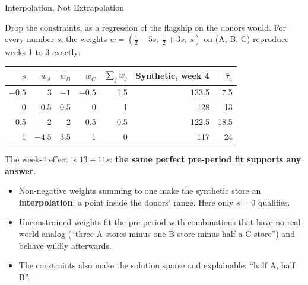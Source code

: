 \documentclass[aspectratio=169, 11pt, handout]{beamer}
\newcommand{\hatt}{\hat{\tau}}
\begin{document}
\begin{frame}{Interpolation, Not Extrapolation}

Drop the constraints, as a regression of the flagship on the donors would. For every number $s$, the weights $w = (\tfrac12 - 5s,\ \tfrac12 + 3s,\ s)$ on (A, B, C) reproduce weeks 1 to 3 exactly:

\begin{center}
\small
\begin{tabular}{rrrrrrr}
\toprule
$s$ & $w_A$ & $w_B$ & $w_C$ & $\sum_j w_j$ & \textbf{Synthetic, week 4} & $\hatt_4$ \\
\midrule
$-0.5$ & 3 & $-1$ & $-0.5$ & 1.5 & 133.5 & 7.5 \\
\rowcolor{greentint} 0 & 0.5 & 0.5 & 0 & 1 & 128 & 13 \\
0.5 & $-2$ & 2 & 0.5 & 0.5 & 122.5 & 18.5 \\
1 & $-4.5$ & 3.5 & 1 & 0 & 117 & 24 \\
\bottomrule
\end{tabular}
\end{center}

The week-4 effect is $13 + 11s$: \textbf{the same perfect pre-period fit supports any answer}.

\medskip

\begin{itemize}
  \item Non-negative weights summing to one make the synthetic store an \textbf{interpolation}: a point inside the donors' range. Here only $s = 0$ qualifies.
  \item Unconstrained weights fit the pre-period with combinations that have no real-world analog (``three A stores minus one B store minus half a C store'') and behave wildly afterwards.
  \item The constraints also make the solution sparse and explainable: ``half A, half B''.
\end{itemize}
\end{frame}
\end{document}
